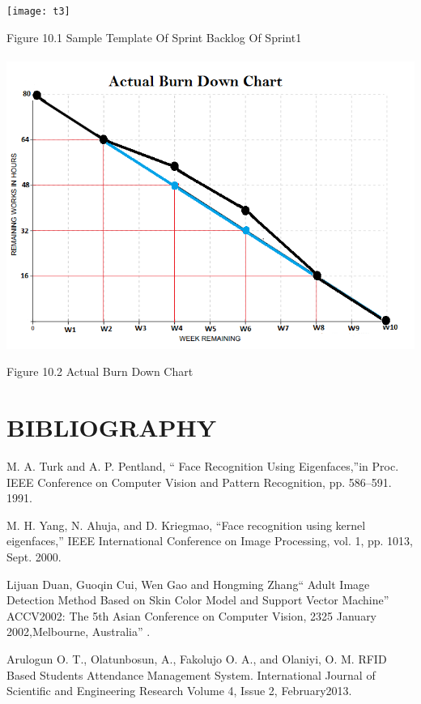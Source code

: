 \documentclass[a4paper, 12pt]{report}
\begin{document}
    \texttt{[image: t3]}
    
    \begin{center} 
    Figure 10.1 Sample Template Of Sprint Backlog Of Sprint1
    \paragraph{}
    \end{center}
   
    \includegraphics[width=.8\textwidth]{BURDOWNEDITED12}
     \begin{center} 
    Figure 10.2 Actual Burn Down Chart
   
    \end{center}
\newpage
\section{BIBLIOGRAPHY}
\begin{enumerate}[label={$\left[1\right]$}]



\item
 M. A. Turk and A. P. Pentland, “ Face Recognition Using Eigenfaces,”in Proc. IEEE
Conference on Computer Vision and Pattern Recognition, pp. 586–591. 1991.
\end{enumerate}
\begin{enumerate}[label={$\left[2\right]$}]

\item
M. H. Yang, N. Ahuja, and D. Kriegmao, “Face recognition using kernel eigenfaces,”
IEEE International Conference on Image Processing, vol. 1, pp. 1013, Sept. 2000.
\end{enumerate}
\begin{enumerate}[label={$\left[3\right]$}]
\item
Lijuan Duan, Guoqin Cui, Wen Gao and Hongming Zhang“ Adult Image Detection
Method Based on Skin Color Model and Support Vector Machine” ACCV2002: The 5th Asian
Conference on Computer Vision, 2325 January 2002,Melbourne, Australia” .
\end{enumerate}
\begin{enumerate}[label={$\left[4\right]$}]
\item
Arulogun O. T., Olatunbosun, A., Fakolujo O. A., and Olaniyi, O. M. RFID Based
Students Attendance Management System. International Journal of Scientific and Engineering
Research Volume 4, Issue 2, February2013.
\end{enumerate}
\end{document}
